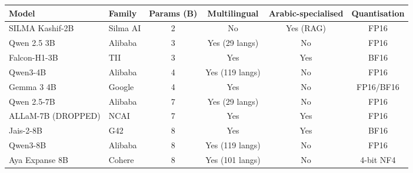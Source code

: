 \begin{tabular}{llcccc}
\toprule
Model & Family & Params (B) & Multilingual & Arabic-specialised & Quantisation \\
\midrule
SILMA Kashif-2B & Silma AI & 2 & No & Yes (RAG) & FP16 \\
Qwen 2.5 3B & Alibaba & 3 & Yes (29 langs) & No & FP16 \\
Falcon-H1-3B & TII & 3 & Yes & Yes & BF16 \\
Qwen3-4B & Alibaba & 4 & Yes (119 langs) & No & FP16 \\
Gemma 3 4B & Google & 4 & Yes & No & FP16/BF16 \\
Qwen 2.5-7B & Alibaba & 7 & Yes (29 langs) & No & FP16 \\
ALLaM-7B (DROPPED) & NCAI & 7 & Yes & Yes & FP16 \\
Jais-2-8B & G42 & 8 & Yes & Yes & BF16 \\
Qwen3-8B & Alibaba & 8 & Yes (119 langs) & No & FP16 \\
Aya Expanse 8B & Cohere & 8 & Yes (101 langs) & No & 4-bit NF4 \\
\bottomrule
\end{tabular}
